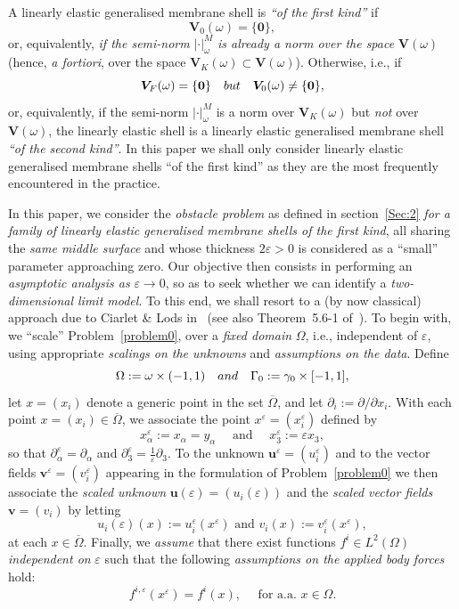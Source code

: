 \documentclass{amsart}
\begin{document}
A linearly elastic generalised membrane shell is \emph{``of the first kind''} if 
$$
\bm{V}_{0}(\omega)=\{\bm{0}\},
$$
or, equivalently, \emph{if the semi-norm} $\left|\cdot\right|_\omega^M$ \emph{is already a norm over the space} $\bm{V}(\omega)$ (hence, \emph{a fortiori}, over the space $\bm{V}_K(\omega) \subset \bm{V}(\omega)$).
Otherwise, i.e., if 
$$
{\bm{V}_F(\omega)=\{\bm{0}\}} \quad\textup{but}\quad {\bm{V}_{0}(\omega)\neq \{\bm{0}\}},
$$
or, equivalently, if the semi-norm $\left|\cdot\right|_\omega^M$ is a norm over $\bm{V}_K(\omega)$ but \emph{not} over $\bm{V}(\omega)$, the linearly elastic shell is a linearly elastic generalised membrane shell \emph{``of the second kind''}.
In this paper we shall only consider linearly elastic generalised membrane shells ``of the first kind'' as they are the most frequently encountered in the practice.

In this paper, we consider the \emph{obstacle problem} as defined in section~\ref{Sec:2} \emph{for a family of linearly elastic generalised membrane shells of the first kind}, all sharing the \emph{same middle surface} and whose thickness $2 \varepsilon > 0$ is considered as a ``small'' parameter approaching zero. Our objective then consists in performing an \emph{asymptotic analysis as} $\varepsilon \to 0$, so as to seek whether we can identify a \emph{two-dimensional limit model}. To this end, we shall resort to a (by now classical) approach due to Ciarlet \& Lods in~\cite{CiaLods1996d} (see also Theorem~5.6-1 of~\cite{Ciarlet2000}). To begin with, we ``scale'' Problem~\ref{problem0}, over a \emph{fixed domain} $\Omega$, i.e., independent of $\varepsilon$, using appropriate \emph{scalings on the unknowns} and \emph{assumptions on the data}.
Define
$$
\Omega := \omega \times (-1,1)\quad\textup{ and }\quad\Gamma_0:=\gamma_0\times [-1,1],
$$
let $x=(x_i)$ denote a generic point in the set $\overline{\Omega}$, and let $\partial_i:=\partial/\partial x_i$. With each point $x=(x_i)\in\overline{\Omega}$, we associate  the point $x^\varepsilon=(x^\varepsilon_i)$ defined by
$$
x^\varepsilon_\alpha:=x_\alpha=y_\alpha \quad\text{ and }\quad x^\varepsilon_3:=\varepsilon x_3,
$$
so that $\partial^\varepsilon_\alpha=\partial_\alpha$ and $\partial^\varepsilon_3=\frac{1}{\varepsilon} \partial_3$. To the unknown $\bm{u}^\varepsilon=(u^\varepsilon_i)$ and to the vector fields $\bm{v}^\varepsilon=(v^\varepsilon_i)$ appearing in the formulation of Problem~\ref{problem0} we then associate the \emph{scaled unknown} $\bm{u}(\varepsilon)=(u_i(\varepsilon))$ and the \emph{scaled vector fields} $\bm{v}=(v_i)$ by letting
$$
u_i(\varepsilon)(x):=u^\varepsilon_i(x^\varepsilon)\text{ and }v_i(x):=v^\varepsilon_i(x^\varepsilon),
$$
at each $x\in \overline{\Omega}$. Finally, we \emph{assume} that there exist functions $f^i \in L^2(\Omega)$ \emph{independent on} $\varepsilon$ such that the following \emph{assumptions on the applied body forces} hold:
\begin{equation*}
f^{i, \varepsilon} (x^\varepsilon) = f^i(x),\quad \text{ for a.a. } x \in \Omega.
\end{equation*}
\end{document}
